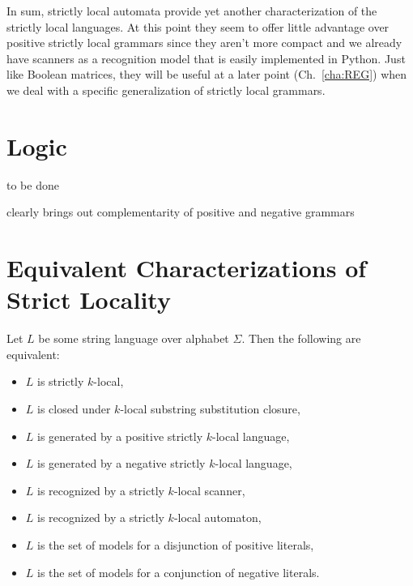 In sum, strictly local automata provide yet another characterization of the strictly local languages.
At this point they seem to offer little advantage over positive strictly local grammars since they aren't more compact and we already have scanners as a recognition model that is easily implemented in Python.
Just like Boolean matrices, they will be useful at a later point (Ch.~\ref{cha:REG}) when we deal with a specific generalization of strictly local grammars.



\section{Logic}

    to be done

    clearly brings out complementarity of positive and negative grammars

\section{Equivalent Characterizations of Strict Locality}

\begin{theorem}
    Let $L$ be some string language over alphabet $\Sigma$.
    Then the following are equivalent:
    \begin{itemize}
        \item $L$ is strictly $k$-local,
        \item $L$ is closed under $k$-local substring substitution closure,
        \item $L$ is generated by a positive strictly $k$-local language,
        \item $L$ is generated by a negative strictly $k$-local language,
        \item $L$ is recognized by a strictly $k$-local scanner,
        \item $L$ is recognized by a strictly $k$-local automaton,
        \item $L$ is the set of models for a disjunction of positive literals,
        \item $L$ is the set of models for a conjunction of negative literals.
    \end{itemize}
\end{theorem}
